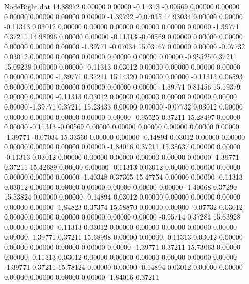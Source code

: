 \begin{filecontents}{NodeRight.dat}
  14.88972    0.00000    0.00000    -0.11313   -0.00569    0.00000    0.00000    0.00000    0.00000    0.00000    0.00000   -1.39792   -0.07035
  14.93034    0.00000    0.00000    -0.11313    0.03012    0.00000    0.00000    0.00000    0.00000    0.00000    0.00000   -1.39771    0.37211
  14.98096    0.00000    0.00000    -0.11313   -0.00569    0.00000    0.00000    0.00000    0.00000    0.00000    0.00000   -1.39771   -0.07034
  15.03167    0.00000    0.00000    -0.07732    0.03012    0.00000    0.00000    0.00000    0.00000    0.00000    0.00000   -0.95525    0.37211
  15.08238    0.00000    0.00000    -0.11313    0.03012    0.00000    0.00000    0.00000    0.00000    0.00000    0.00000   -1.39771    0.37211
  15.14320    0.00000    0.00000    -0.11313    0.06593    0.00000    0.00000    0.00000    0.00000    0.00000    0.00000   -1.39771    0.81456
  15.19379    0.00000    0.00000    -0.11313    0.03012    0.00000    0.00000    0.00000    0.00000    0.00000    0.00000   -1.39771    0.37211
  15.23433    0.00000    0.00000    -0.07732    0.03012    0.00000    0.00000    0.00000    0.00000    0.00000    0.00000   -0.95525    0.37211
  15.28497    0.00000    0.00000    -0.11313   -0.00569    0.00000    0.00000    0.00000    0.00000    0.00000    0.00000   -1.39771   -0.07034
  15.33560    0.00000    0.00000    -0.14894    0.03012    0.00000    0.00000    0.00000    0.00000    0.00000    0.00000   -1.84016    0.37211
  15.38637    0.00000    0.00000    -0.11313    0.03012    0.00000    0.00000    0.00000    0.00000    0.00000    0.00000   -1.39771    0.37211
  15.42689    0.00000    0.00000    -0.11313    0.03012    0.00000    0.00000    0.00000    0.00000    0.00000    0.00000   -1.40348    0.37365
  15.47754    0.00000    0.00000    -0.11313    0.03012    0.00000    0.00000    0.00000    0.00000    0.00000    0.00000   -1.40068    0.37290
  15.53824    0.00000    0.00000    -0.14894    0.03012    0.00000    0.00000    0.00000    0.00000    0.00000    0.00000   -1.84823    0.37374
  15.58870    0.00000    0.00000    -0.07732    0.03012    0.00000    0.00000    0.00000    0.00000    0.00000    0.00000   -0.95714    0.37284
  15.63928    0.00000    0.00000    -0.11313    0.03012    0.00000    0.00000    0.00000    0.00000    0.00000    0.00000   -1.39771    0.37211
  15.68998    0.00000    0.00000    -0.11313    0.03012    0.00000    0.00000    0.00000    0.00000    0.00000    0.00000   -1.39771    0.37211
  15.73063    0.00000    0.00000    -0.11313    0.03012    0.00000    0.00000    0.00000    0.00000    0.00000    0.00000   -1.39771    0.37211
  15.78124    0.00000    0.00000    -0.14894    0.03012    0.00000    0.00000    0.00000    0.00000    0.00000    0.00000   -1.84016    0.37211

\end{filecontents}
